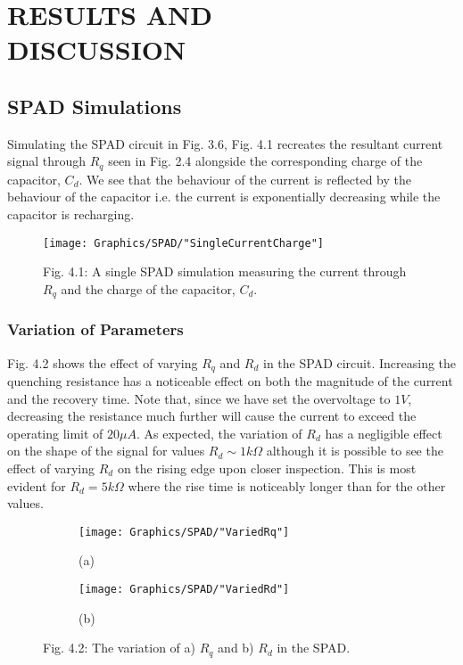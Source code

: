 
\section{RESULTS AND \\DISCUSSION}

\subsection{SPAD Simulations}

Simulating the SPAD circuit in Fig. 3.6, Fig. 4.1 recreates the resultant current signal through $R_q$ seen in Fig. 2.4 alongside the corresponding charge of the capacitor, $C_d$. We see that the behaviour of the current is reflected by the behaviour of the capacitor i.e. the current is exponentially decreasing while the capacitor is recharging.

\begin{figure}[h]
  \centering
  \texttt{[image: Graphics/SPAD/"SingleCurrentCharge"]}
  {\caption*{Fig. 4.1: A single SPAD simulation measuring the current through $R_q$ and the charge of the capacitor, $C_d$.}}
\end{figure}

\subsubsection{Variation of Parameters}

Fig. 4.2 shows the effect of varying $R_q$ and $R_d$ in the SPAD circuit. Increasing the quenching resistance has a noticeable effect on both the magnitude of the current and the recovery time. Note that, since we have set the overvoltage to $1V$, decreasing the resistance much further will cause the current to exceed the operating limit of $20\mu A$. As expected, the variation of $R_d$ has a negligible effect on the shape of the signal for values $R_d\sim 1k\Omega$ although it is possible to see the effect of varying $R_d$ on the rising edge upon closer inspection. This is most evident for $R_d=5k\Omega$ where the rise time is noticeably longer than for the other values.

\begin{figure}[h]
  \centering
  \begin{subfigure}
    \centering
    \texttt{[image: Graphics/SPAD/"VariedRq"]}
    \caption*{(a)}
  \end{subfigure}
  \begin{subfigure}
    \centering
    \texttt{[image: Graphics/SPAD/"VariedRd"]}
    \caption*{(b)}
  \end{subfigure}
  {\caption*{Fig. 4.2: The variation of a) $R_q$ and b) $R_d$ in the SPAD.}}
\end{figure}

